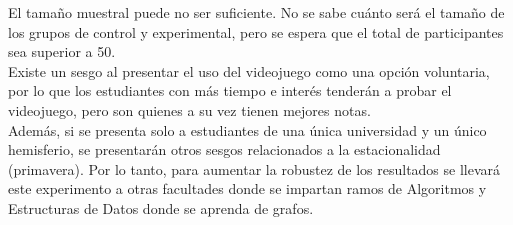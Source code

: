 \documentclass[submission]{eptcs}
\begin{document}
El tamaño muestral puede no ser suficiente. No se sabe cuánto será el tamaño de los grupos de control
y experimental, pero se espera que el total de participantes sea superior a 50. \\
Existe un sesgo al presentar el uso del videojuego como una opción voluntaria, por lo que los estudiantes
con más tiempo e interés tenderán a probar el videojuego, pero son quienes a su vez tienen mejores notas. \\
Además, si se presenta solo a estudiantes de una única universidad y un único hemisferio, se presentarán otros sesgos
relacionados a la estacionalidad (primavera). Por lo tanto, para aumentar la robustez de los resultados se 
llevará este experimento a otras facultades donde se impartan ramos de Algoritmos y Estructuras de Datos donde se
aprenda de grafos.

\nocite{*}


\end{document}
